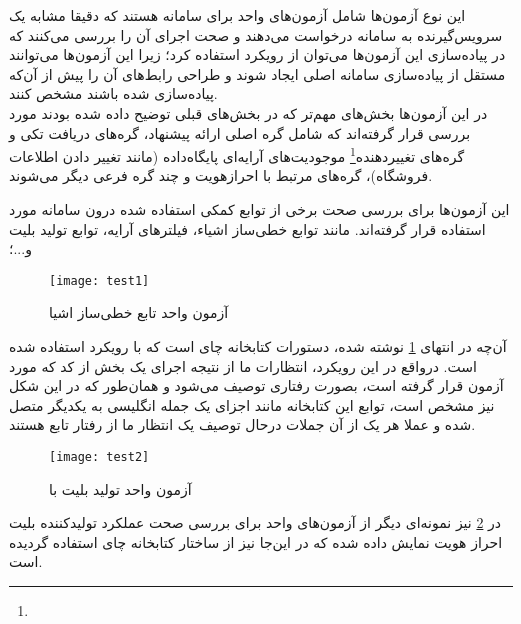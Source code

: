 
این نوع آزمون‌ها شامل آزمون‌های واحد برای  سامانه هستند که دقیقا مشابه یک سرویس‌گیرنده به سامانه درخواست می‌دهند و صحت اجرای آن را بررسی می‌کنند که در پیاده‌سازی این آزمون‌ها می‌توان از رویکرد  استفاده کرد؛ زیرا این آزمون‌ها می‌توانند مستقل از پیاده‌سازی سامانه اصلی ایجاد شوند و طراحی رابط‌های آن را پیش از آن‌که پیاده‌سازی شده باشند مشخص کنند.\\

در این آزمون‌ها بخش‌های مهم‌تر  که در بخش‌های قبلی توضیح داده شده بودند مورد بررسی قرار گرفته‌اند که شامل گره اصلی ارائه پیشنهاد، گره‌های دریافت تکی و گره‌های تغییردهنده\footnote{} موجودیت‌های آرایه‌ای پایگاه‌داده (مانند تغییر دادن اطلاعات فروشگاه)، گره‌های مرتبط با احرازهویت و چند گره فرعی دیگر می‌شوند.


این آزمون‌ها برای بررسی صحت برخی از توابع کمکی استفاده شده درون سامانه مورد استفاده قرار گرفته‌اند. مانند توابع خطی‌ساز اشیاء، فیلترهای آرایه، توابع تولید بلیت  و...؛

\begin{figure}[H]
	\centering
	\texttt{[image: test1]}
	\caption{آزمون واحد تابع خطی‌ساز اشیا}
	\label{fig:test1}
\end{figure}

\newpage

آن‌چه در انتهای \cref{fig:test1} نوشته شده، دستورات کتابخانه چای است که با رویکرد  استفاده شده است. درواقع در این رویکرد، انتظارات ما از نتیجه اجرای یک بخش از کد که مورد آزمون قرار گرفته است، بصورت رفتاری توصیف می‌شود و همان‌طور که در این شکل نیز مشخص است، توابع این کتابخانه مانند اجزای یک جمله انگلیسی به یکدیگر متصل شده و عملا هر یک از آن جملات درحال توصیف یک انتظار ما از رفتار تابع  هستند.

\begin{figure}[H]
	\centering
	\texttt{[image: test2]}
	\caption{آزمون واحد تولید بلیت با }
	\label{fig:test2}
\end{figure}

	در \cref{fig:test2} نیز نمونه‌ای دیگر از آزمون‌های واحد برای بررسی صحت عملکرد تولیدکننده بلیت احراز هویت  نمایش داده شده که در این‌جا نیز از ساختار  کتابخانه چای استفاده گردیده است.

